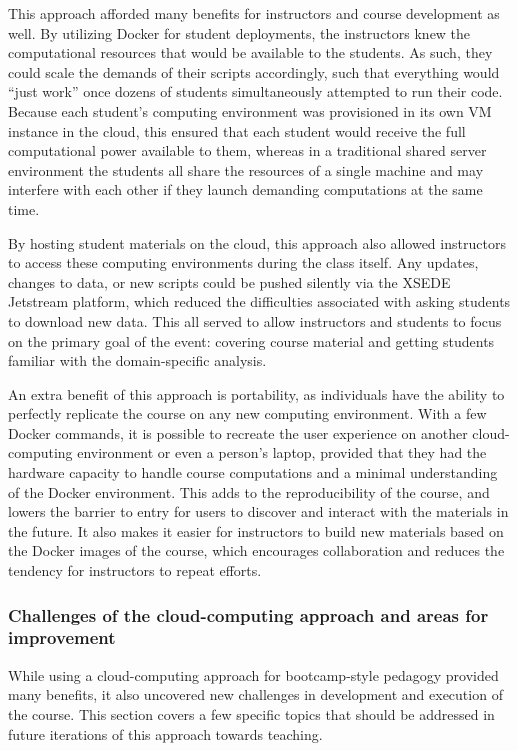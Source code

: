 This approach afforded many benefits for instructors and course development as
well. By utilizing Docker for student deployments, the instructors knew the
computational resources that would be available to the students. As such, they
could scale the demands of their scripts accordingly, such that everything would
``just work'' once dozens of students simultaneously attempted to run their
code. Because each student's computing environment was provisioned in its own VM
instance in the cloud, this ensured that each student would receive the full
computational power available to them, whereas in a traditional shared server
environment the students all share the resources of a single machine and may
interfere with each other if they launch demanding computations at the same
time.

By hosting student materials on the cloud, this approach also allowed instructors
to access these computing environments during the class itself. Any updates,
changes to data, or new scripts could be pushed silently via the XSEDE Jetstream
platform, which reduced the difficulties associated with asking students to
download new data. This all served to allow instructors and students to focus on
the primary goal of the event: covering course material and getting students
familiar with the domain-specific analysis.

An extra benefit of this approach is portability, as individuals have the
ability to perfectly replicate the course on any new computing environment. With
a few Docker commands, it is possible to recreate the user experience on another
cloud-computing environment or even a person's laptop, provided that they had
the hardware capacity to handle course computations and a minimal understanding
of the Docker environment. This adds to the reproducibility of the course, and
lowers the barrier to entry for users to discover and interact with the
materials in the future. It also makes it easier for instructors to build new
materials based on the Docker images of the course, which encourages
collaboration and reduces the tendency for instructors to repeat efforts.

\subsubsection{Challenges of the cloud-computing approach and areas for improvement}

While using a cloud-computing approach for bootcamp-style pedagogy provided many
benefits, it also uncovered new challenges in development and execution of the
course. This section covers a few specific topics that should be addressed in
future iterations of this approach towards teaching.

